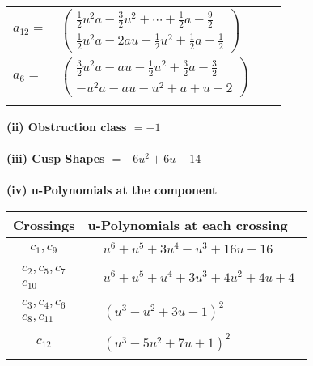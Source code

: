 \documentclass[1p]{elsarticle_modified}
\theoremstyle{definition}
\begin{document}
\begin{tabular}{m{7pt} m{180pt} m{7pt} m{180pt} }
\flushright $a_{12}=$&$\begin{pmatrix}\frac{1}{2} u^2 a-\frac{3}{2} u^2+\cdots+\frac{1}{2} a-\frac{9}{2}\\\frac{1}{2} u^2 a-2 a u-\frac{1}{2} u^2+\frac{1}{2} a-\frac{1}{2}\end{pmatrix}$ \\
\flushright $a_{6}=$&$\begin{pmatrix}\frac{3}{2} u^2 a- a u-\frac{1}{2} u^2+\frac{3}{2} a-\frac{3}{2}\\- u^2 a- a u- u^2+a+u-2\end{pmatrix}$\\&\end{tabular}
\flushleft \textbf{(ii) Obstruction class $= -1$}\\~\\
\flushleft \textbf{(iii) Cusp Shapes $= -6 u^2+6 u-14$}\\~\\
\newpage\renewcommand{\arraystretch}{1}
\flushleft \textbf{(iv) u-Polynomials at the component}\newline \\
\begin{tabular}{m{50pt}|m{274pt}}
Crossings & \hspace{64pt}u-Polynomials at each crossing \\
\hline $$\begin{aligned}c_{1},c_{9}\end{aligned}$$&$\begin{aligned}
&u^6+u^5+3 u^4- u^3+16 u+16
\end{aligned}$\\
\hline $$\begin{aligned}c_{2},c_{5},c_{7}\\c_{10}\end{aligned}$$&$\begin{aligned}
&u^6+u^5+u^4+3 u^3+4 u^2+4 u+4
\end{aligned}$\\
\hline $$\begin{aligned}c_{3},c_{4},c_{6}\\c_{8},c_{11}\end{aligned}$$&$\begin{aligned}
&(u^3- u^2+3 u-1)^2
\end{aligned}$\\
\hline $$\begin{aligned}c_{12}\end{aligned}$$&$\begin{aligned}
&(u^3-5 u^2+7 u+1)^2
\end{aligned}$\\
\hline
\end{tabular}\\~\\
\end{document}

